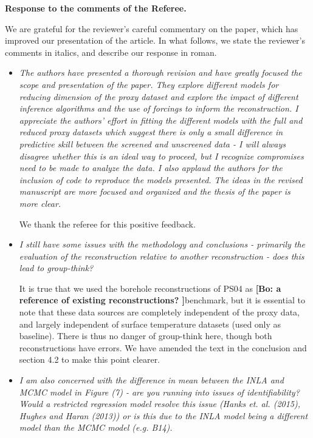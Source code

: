 \documentclass[11pt]{article}
\newcommand{\bl}[1]{\color{red}\textbf{[Bo: #1]}\normalcolor}
\begin{document}
\begin{center}
  {\Large \textbf{Response to the comments of the Referee.}}
\end{center}

We are grateful for the reviewer's careful commentary on the paper, which has improved
our presentation of the article. In what follows, we state the reviewer's
comments in italics, and describe our response in roman.

\begin{itemize}
  
\item \textit{The authors have presented a thorough revision and have greatly
    focused the scope and presentation of the paper. They explore different
    models for reducing dimension of the proxy dataset and explore the impact of
    different inference algorithms and the use of forcings to inform the
    reconstruction. I appreciate the authors’ effort in fitting the different
    models with the full and reduced proxy datasets which suggest there is only
    a small difference in predictive skill between the screened and unscreened
    data - I will always disagree whether this is an ideal way to proceed, but I
    recognize compromises need to be made to analyze the data. I also applaud
    the authors for the inclusion of code to reproduce the models presented. The
    ideas in the revised manuscript are more focused and organized and the thesis of the paper is more clear.
}

We thank the referee for this positive feedback. 
\item \textit{I still have some issues with the methodology and conclusions -
    primarily the evaluation of the reconstruction relative to another
    reconstruction - does this lead to group-think?}

It is true that we used the borehole reconstructions of PS04 as \bl{a reference of existing reconstructions? }benchmark, but it is essential to note that these data sources are completely independent of the proxy data, and largely independent of surface temperature datasets (used only as baseline). There is thus no danger of group-think here, though both reconstructions have errors. We have amended the text in the conclusion and section 4.2 to make this point clearer.


  
\item \textit{I am also concerned with the
    difference in mean between the INLA and MCMC model in Figure (7) - are you
    running into issues of identifiability? Would a restricted regression model
    resolve this issue (Hanks et. al. (2015), Hughes and Haran (2013)) or is
    this due to the INLA model being a different model than the MCMC model (e.g.
    B14).}


\end{itemize}
\end{document}

